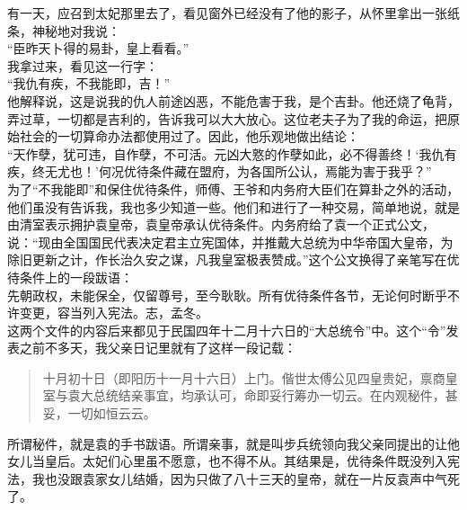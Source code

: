 有一天，应召到太妃那里去了，看见窗外已经没有了他的影子，从怀里拿出一张纸条，神秘地对我说：\\

“臣昨天卜得的易卦，皇上看看。”\\

我拿过来，看见这一行字：\\

“我仇有疾，不我能即，吉！”\\

他解释说，这是说我的仇人前途凶恶，不能危害于我，是个吉卦。他还烧了龟背，弄过草，一切都是吉利的，告诉我可以大大放心。这位老夫子为了我的命运，把原始社会的一切算命办法都使用过了。因此，他乐观地做出结论：\\

“天作孽，犹可违，自作孽，不可活。元凶大憝的作孽如此，必不得善终！‘我仇有疾，终无尤也！’何况优待条件藏在盟府，为各国所公认，焉能为害于我乎？”\\

为了“不我能即”和保住优待条件，师傅、王爷和内务府大臣们在算卦之外的活动，他们虽没有告诉我，我也多少知道一些。他们和进行了一种交易，简单地说，就是由清室表示拥护袁皇帝，袁皇帝承认优待条件。内务府给了袁一个正式公文，说：“现由全国国民代表决定君主立宪国体，并推戴大总统为中华帝国大皇帝，为除旧更新之计，作长治久安之谋，凡我皇室极表赞成。”这个公文换得了亲笔写在优待条件上的一段跋语：\\

先朝政权，未能保全，仅留尊号，至今耿耿。所有优待条件各节，无论何时断乎不许变更，容当列入宪法。志，孟冬。\\

这两个文件的内容后来都见于民国四年十二月十六日的“大总统令”中。这个“令”发表之前不多天，我父亲日记里就有了这样一段记载：\\

\begin{quote}
	十月初十日（即阳历十一月十六日）上门。偕世太傅公见四皇贵妃，禀商皇室与袁大总统结亲事宜，均承认可，命即妥行筹办一切云。在内观秘件，甚妥，一切如恒云云。\\
\end{quote}

所谓秘件，就是袁的手书跋语。所谓亲事，就是叫步兵统领向我父亲同提出的让他女儿当皇后。太妃们心里虽不愿意，也不得不从。其结果是，优待条件既没列入宪法，我也没跟袁家女儿结婚，因为只做了八十三天的皇帝，就在一片反袁声中气死了。
